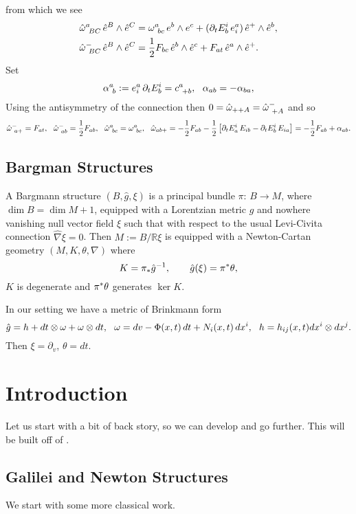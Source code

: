 \documentclass{article}
\begin{document}
from which we see
\begin{align*}
	\hat \omega\sp{a}_{\ B C}\, {\hat e}\sp{B}\wedge {\hat e}\sp{C}&= \omega\sp{a}_{\ bc}\, e\sp{b}\wedge e\sp{c}+(\partial_t E\sp{i}_b\, { e}\sp{a}_{i} )\,  {\hat e}\sp{+}\wedge {\hat e}\sp{b},\\
	\hat \omega\sp{-}_{\ B C}\, {\hat e}\sp{B}\wedge {\hat e}\sp{C}&= \frac12 F_{bc}\, {\hat e}\sp{b}\wedge {\hat e}\sp{c} +F_{at}\, {\hat e}\sp{a}\wedge {\hat e}\sp{+}.
\end{align*}
Set
$$\alpha\sp{a}_{\ b}:= { e}\sp{a}_{i} \,\partial_t E\sp{i}_b=c\sp{a}_{\ +b},\ \
\alpha_{ab}=-\alpha_{ba}, $$
Using the antisymmetry of the connection then $0=\hat\omega_{++A}=\hat\omega\sp{-}_{\ +A}$
and so
$$\hat\omega\sp{-}_{\ a+}= F_{at},\ \  \hat\omega\sp{-}_{\ ab}= \frac12 F_{ab},\ \
\hat\omega\sp{a}_{\ bc}=\omega\sp{a}_{\ bc}, \ \
\hat\omega_{a b+}=-\frac12 F_{a b} -\frac12\left[ \partial_t E\sp{i}_a \,E_{ib}
-  \partial_t E\sp{i}_b \,E_{ia}  \right]=-\frac12 F_{a b}+\alpha_{ab}.
$$

\subsection{Bargman Structures}
A Bargmann structure $(B, \hat g, \xi)$ is a principal bundle $\pi:\, B\rightarrow M$, where $\dim B=\dim M+1$,
equipped with a Lorentzian metric $\hat g$ and nowhere vanishing null vector field $\xi$ such that with respect to the usual Levi-Civita connection $\hat \nabla \xi=0$. Then $M:=B/\mathbb{R}\xi$ is equipped with
a Newton-Cartan geometry $(M, K, \theta, \nabla)$ where
$$ K=\pi_\ast {\hat g}\sp{-1}, \qquad \hat g(\xi)=\pi\sp\ast\theta,$$
$K$ is degenerate and $\pi\sp\ast\theta$ generates $\ker K$.

In our setting we have a metric of Brinkmann form
$$\hat g= h + dt\otimes \omega+\omega\otimes dt,\ \
\omega= dv -\Phi(x,t)\, dt+ N_i(x,t)\, dx\sp{i}, \ \  h=h_{ij}(x,t) dx\sp{i}\otimes dx\sp{j}.
$$
Then $\xi =\partial_v$, $\theta=dt$.

\section{Introduction}

Let us start with a bit of back story, so we can develop and go further. This will be built off of \cite{Duval1985}.
\subsection{Galilei and Newton Structures}
We start with some more classical work.
\end{document}
